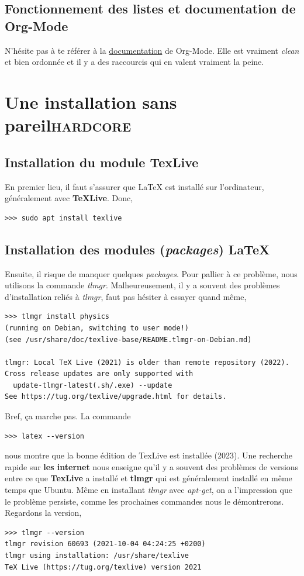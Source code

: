 \documentclass[8pt]{article}
\numberwithin{equation}{section}
\begin{document}
\subsection{Fonctionnement des listes et documentation de Org-Mode}
\label{sec:orgf7b39e8}
N'hésite pas à te référer à la \href{https://orgmode.org/manual/Plain-Lists.html}{documentation} de Org-Mode.
Elle est vraiment \emph{clean} et bien ordonnée et il y a des raccourcis qui en valent vraiment la peine.

\section{Une installation sans pareil\hfill{}\textsc{hardcore}}
\label{sec:orge0592b8}
\subsection{Installation du module TexLive}
\label{sec:orgdb7baf3}
En premier lieu, il faut s'assurer que \LaTeX{} est installé sur l'ordinateur, généralement avec \textbf{TeXLive}.
Donc,
\begin{verbatim}
>>> sudo apt install texlive
\end{verbatim}

\subsection{Installation des modules (\emph{packages}) \LaTeX{}}
\label{sec:org05aede9}
Ensuite, il risque de manquer quelques \emph{packages}.
Pour pallier à ce problème, nous utilisons la commande \emph{tlmgr}.
Malheureusement, il y a souvent des problèmes d'installation reliés à \emph{tlmgr}, faut pas hésiter à essayer quand même,
\begin{verbatim}
>>> tlmgr install physics
(running on Debian, switching to user mode!)
(see /usr/share/doc/texlive-base/README.tlmgr-on-Debian.md)

tlmgr: Local TeX Live (2021) is older than remote repository (2022).
Cross release updates are only supported with
  update-tlmgr-latest(.sh/.exe) --update
See https://tug.org/texlive/upgrade.html for details.
\end{verbatim}
Bref, ça marche pas.
La commande 
\begin{verbatim}
>>> latex --version
\end{verbatim}
nous montre que la bonne édition de TexLive est installée (2023). 
Une recherche rapide sur \textbf{les internet} nous enseigne qu'il y a souvent des problèmes de versions entre ce que \textbf{TexLive} a installé et \textbf{tlmgr} qui est généralement installé en même temps que Ubuntu.
Même en installant \emph{tlmgr} avec \emph{apt-get}, on a l'impression que le problème persiste, comme les prochaines commandes nous le démontrerons.
Regardons la version,
\begin{verbatim}
>>> tlmgr --version
tlmgr revision 60693 (2021-10-04 04:24:25 +0200)
tlmgr using installation: /usr/share/texlive
TeX Live (https://tug.org/texlive) version 2021
\end{verbatim}
\end{document}

